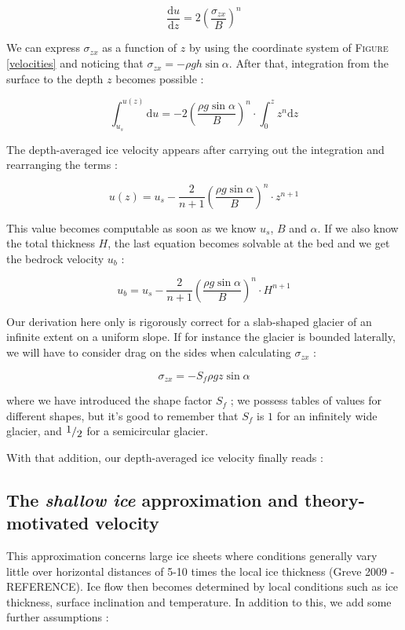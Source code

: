 \documentclass[11pt]{report}
\begin{document}
\[\frac{\mathrm{d} u}{\mathrm{d} z} = 2 \left( \frac{\sigma_{zx}}{B}\right)^n\]

We can express $\sigma_{zx}$ as a function of $z$ by using the coordinate system of \textsc{Figure} \ref{velocities} and noticing that $\sigma_{zx} = -\rho g h \sin{\alpha}$. After that, integration from the surface to the depth $z$ becomes possible :

\[\int_{u_s}^{u(z)} \mathrm{d} u = -2 \left( \frac{\rho g \sin{\alpha}}{B}\right)^n \cdot \int_{0}^{z} z^n \mathrm{d} z\]


The depth-averaged ice velocity appears after carrying out the integration and rearranging the terms :

\[u(z) = u_s - \frac{2}{n + 1} \left( \frac{\rho g \sin{\alpha}}{B}\right)^n \cdot z^{n+1}\]

This value becomes computable as soon as we know $u_s$, $B$ and $\alpha$. If we also know the total thickness $H$, the last equation becomes solvable at the bed and we get the bedrock velocity $u_b$ :

\[u_b = u_s - \frac{2}{n + 1} \left( \frac{\rho g \sin{\alpha}}{B}\right)^n \cdot H^{n+1}\]

Our derivation here only is rigorously correct for a slab-shaped glacier of an infinite extent on a uniform slope. If for instance the glacier is bounded laterally, we will have to consider drag on the sides when calculating $\sigma_{zx}$ :

\[\sigma_{zx} = -S_f \rho g z \sin{\alpha}\]

where we have introduced the shape factor $S_f$ ; we possess tables of values for different shapes, but it's good to remember that $S_f$ is $1$ for an infinitely wide glacier, and $\fraction{1}{2}$ for a semicircular glacier.

With that addition, our depth-averaged ice velocity finally reads :

\begin{center}
\end{center}


\subsection*{The \textit{shallow ice} approximation and theory-motivated velocity}

This approximation concerns large ice sheets where conditions generally vary little over horizontal distances of 5-10 times the local ice thickness (Greve 2009 - REFERENCE). Ice flow then becomes determined by local conditions such as ice thickness, surface inclination and temperature.
In addition to this, we add some further assumptions :
\end{document}
